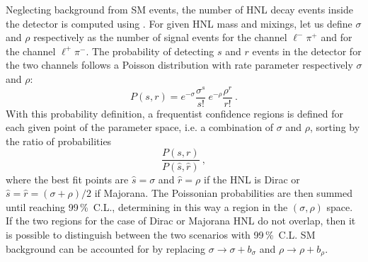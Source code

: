 Neglecting background from SM events, the number of HNL decay events inside the detector is computed %
using .
For given HNL mass and mixings, let us define $\sigma$ and $\rho$ respectively as %
the number of signal events for the channel $\ell^- \pi^+$ and for the channel $\ell^+ \pi^-$.
The probability of detecting $s$ and $r$ events in the detector for the two channels %
follows a Poisson distribution with rate parameter respectively $\sigma$ and $\rho$:
\begin{equation}
	P(s, r) = e^{-\sigma} \frac{\sigma^s}{s!}\ e^{-\rho} \frac{\rho^r}{r!}\ .
\end{equation}
With this probability definition, a frequentist confidence regions is defined %
for each given point of the parameter space, i.e. a combination of $\sigma$ and $\rho$, %
sorting by the ratio of probabilities~\cite{Feldman:1997qc} %
\begin{equation}
	\frac{P(s, r)}{P(\hat{s}, \hat{r})}\ ,
\end{equation}
where the best fit points are $\hat{s} = \sigma$ and $\hat{r} = \rho$ if the HNL is Dirac %
or $\hat{s} = \hat{r} = (\sigma + \rho)/2$ if Majorana.
The Poissonian probabilities are then summed until reaching 99\,\%\ C.L., %
determining in this way a region in the $(\sigma, \rho)$ space.
If the two regions for the case of Dirac or Majorana HNL do not overlap, %
then it is possible to distinguish between the two scenarios with 99\,\%\ C.L.
SM background can be accounted for by replacing $\sigma \to \sigma + b_\sigma$ and $\rho \to \rho + b_\rho$.

